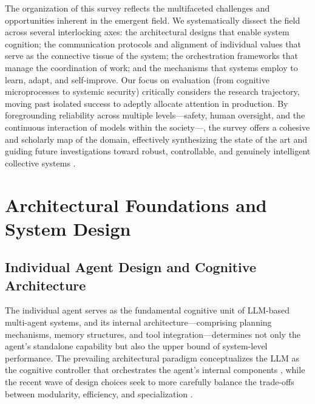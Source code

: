 \documentclass[11pt,a4paper]{article}
\begin{document}
The organization of this survey reflects the multifaceted challenges and opportunities inherent in the emergent field. We systematically dissect the field across several interlocking axes: the architectural designs that enable system cognition; the communication protocols and alignment of individual values that serve as the connective tissue of the system; the orchestration frameworks that manage the coordination of work; and the mechanisms that systems employ to learn, adapt, and self-improve. Our focus on evaluation (from cognitive microprocesses to systemic security) critically considers the research trajectory, moving past isolated success to adeptly allocate attention in production. By foregrounding reliability across multiple levels---safety, human oversight, and the continuous interaction of models within the society---, the survey offers a cohesive and scholarly map of the domain, effectively synthesizing the state of the art and guiding future investigations toward robust, controllable, and genuinely intelligent collective systems \cite{arxiv:2402.01680v2,arxiv:2412.17481v2}.


\section{Architectural Foundations and System Design}



\subsection{Individual Agent Design and Cognitive Architecture}


The individual agent serves as the fundamental cognitive unit of LLM-based multi-agent systems, and its internal architecture---comprising planning mechanisms, memory structures, and tool integration---determines not only the agent's standalone capability but also the upper bound of system-level performance. The prevailing architectural paradigm conceptualizes the LLM as the cognitive controller that orchestrates the agent's internal components \cite{arxiv:2308.11432v5,arxiv:2309.07864v3}, while the recent wave of design choices seek to more carefully balance the trade-offs between modularity, efficiency, and specialization \cite{arxiv:2503.23037v3}.
\end{document}

